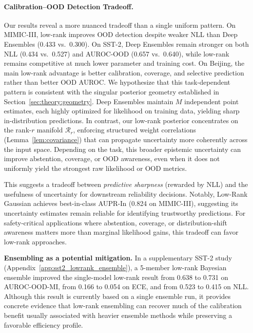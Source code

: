 \documentclass{article}
\theoremstyle{plain}
\theoremstyle{definition}
\theoremstyle{remark}
\begin{document}
\paragraph{Calibration–OOD Detection Tradeoff.}
Our results reveal a more nuanced tradeoff than a single uniform pattern. On MIMIC-III, low-rank improves OOD detection despite weaker NLL than Deep Ensembles (0.433 vs.\ 0.300). On SST-2, Deep Ensembles remain stronger on both NLL (0.434 vs.\ 0.527) and AUROC-OOD (0.657 vs.\ 0.640), while low-rank remains competitive at much lower parameter and training cost. On Beijing, the main low-rank advantage is better calibration, coverage, and selective prediction rather than better OOD AUROC. We hypothesize that this task-dependent pattern is consistent with the singular posterior geometry established in Section~\ref{sec:theory:geometry}. Deep Ensembles maintain $M$ independent point estimates, each highly optimized for likelihood on training data, yielding sharp in-distribution predictions. In contrast, our low-rank posterior concentrates on the rank-$r$ manifold $\mathcal{R}_r$, enforcing structured weight correlations (Lemma~\ref{lem:covariance}) that can propagate uncertainty more coherently across the input space. Depending on the task, this broader epistemic uncertainty can improve abstention, coverage, or OOD awareness, even when it does not uniformly yield the strongest raw likelihood or OOD metrics.

This suggests a tradeoff between \emph{predictive sharpness} (rewarded by NLL) and the usefulness of uncertainty for downstream reliability decisions. Notably, Low-Rank Gaussian achieves best-in-class AUPR-In (0.824 on MIMIC-III), suggesting its uncertainty estimates remain reliable for identifying trustworthy predictions. For safety-critical applications where abstention, coverage, or distribution-shift awareness matters more than marginal likelihood gains, this tradeoff can favor low-rank approaches.

\textbf{Ensembling as a potential mitigation.} In a supplementary SST-2 study (Appendix~\ref{app:sst2_lowrank_ensemble}),
a 5-member low-rank Bayesian ensemble improved the single-model low-rank result
from 0.638 to 0.731 on AUROC-OOD-MI, from 0.166 to 0.054 on ECE, and from 0.523
to 0.415 on NLL. Although this result is currently based on a single ensemble
run, it provides concrete evidence that low-rank ensembling can recover much of
the calibration benefit usually associated with heavier ensemble methods while
preserving a favorable efficiency profile.
\end{document}
